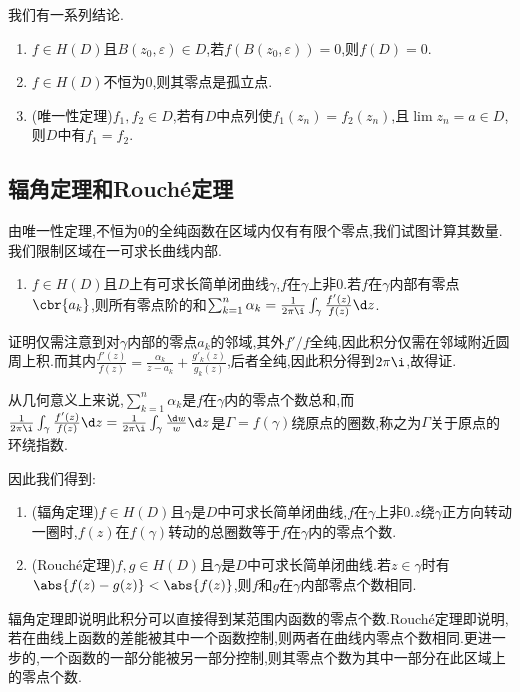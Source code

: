 \documentclass{article}
\begin{document}
我们有一系列结论.
\begin{enumerate}[resume]
    \item $f\in H(D)$且$B(z_0,\varepsilon)\in D$,若$f(B(z_0,\varepsilon))=0$,则$f(D)=0$.\\
    \item $f\in H(D)$不恒为0,则其零点是孤立点.
    \item (唯一性定理)$f_1,f_2\in D$,若有$D$中点列使$f_1(z_n)=f_2(z_n)$,且$\lim z_n=a\in D$,则$D$中有$f_1=f_2$.\\
\end{enumerate}

\subsection{辐角定理和Rouch\'e定理}
由唯一性定理,不恒为0的全纯函数在区域内仅有有限个零点,我们试图计算其数量.我们限制区域在一可求长曲线内部.

\begin{enumerate}
    \item $f\in H(D)$且$D$上有可求长简单闭曲线$\gamma$,$f$在$\gamma$上非0.若$f$在$\gamma$内部有零点$\cbr{a_k}$,则所有零点阶的和$\sum_{k=1}^n\alpha_k=\frac{1}{2\pi\i}\int_\gamma\frac{f'(z)}{f(z)}\d z$.
\end{enumerate}
证明仅需注意到对$\gamma$内部的零点$a_k$的邻域,其外$f'/f$全纯,因此积分仅需在邻域附近圆周上积.而其内$\frac{f'(z)}{f(z)}=\frac{\alpha_k}{z-a_k}+\frac{g'_k(z)}{g_k(z)}$,后者全纯,因此积分得到$2\pi\i$,故得证.

从几何意义上来说,$\sum_{k=1}^n \alpha_k$是$f$在$\gamma$内的零点个数总和,而$\frac{1}{2\pi\i}\int_\gamma\frac{f'(z)}{f(z)}\d z=\frac{1}{2\pi\i}\int_\gamma\frac{\d w}{w}\d z$是$\Gamma=f(\gamma)$绕原点的圈数,称之为$\Gamma$关于原点的环绕指数.

因此我们得到:
\begin{enumerate}[resume]
    \item (辐角定理)$f\in H(D)$且$\gamma$是$D$中可求长简单闭曲线,$f$在$\gamma$上非0.$z$绕$\gamma$正方向转动一圈时,$f(z)$在$f(\gamma)$转动的总圈数等于$f$在$\gamma$内的零点个数.
    \item (Rouch\'e定理)$f,g\in H(D)$且$\gamma$是$D$中可求长简单闭曲线.若$z\in \gamma$时有$\abs{f(z)-g(z)}<\abs{f(z)}$,则$f$和$g$在$\gamma$内部零点个数相同.\\
\end{enumerate}
辐角定理即说明此积分可以直接得到某范围内函数的零点个数.Rouch\'e定理即说明,若在曲线上函数的差能被其中一个函数控制,则两者在曲线内零点个数相同.更进一步的,一个函数的一部分能被另一部分控制,则其零点个数为其中一部分在此区域上的零点个数.
\end{document}
